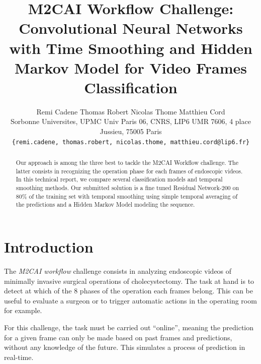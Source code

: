 \documentclass[10pt,twocolumn,letterpaper]{article}
\begin{document}
\title{M2CAI Workflow Challenge: Convolutional Neural Networks with Time Smoothing and Hidden Markov Model for Video Frames Classification}

\author{Remi Cadene \hspace{1cm} Thomas Robert \hspace{1cm} Nicolas Thome \hspace{1cm} Matthieu Cord\\
Sorbonne Universites, UPMC Univ Paris 06, CNRS, LIP6 UMR 7606, 4 place Jussieu, 75005 Paris\\
{\tt\small \{remi.cadene, thomas.robert, nicolas.thome, matthieu.cord@lip6.fr\}}
}

\maketitle

\begin{abstract}
Our approach is among the three best to tackle the M2CAI Workflow challenge. The latter consists in recognizing the operation phase for each frames of endoscopic videos. In this technical report, we compare several classification models and temporal smoothing methods. Our submitted solution is a fine tuned Residual Network-200 on 80\% of the training set with temporal smoothing using simple temporal averaging of the predictions and a Hidden Markov Model modeling the sequence.
\end{abstract}

\section{Introduction}

The \emph{M2CAI workflow} challenge consists in analyzing endoscopic videos of
minimally invasive surgical operations of cholecystectomy. The task at hand is
to detect at which of the 8 phases of the operation each frames belong. This can
be useful to evaluate a surgeon or to trigger automatic actions in the operating
room for example.

For this challenge, the task must be carried out ``online'', meaning the prediction
for a given frame can only be made based on past frames and predictions, without
any knowledge of the future. This simulates a process of prediction in real-time.
\end{document}
